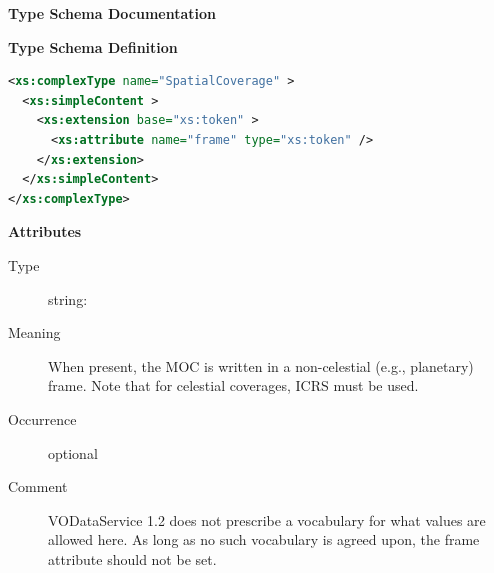 \documentclass[11pt,a4paper]{ivoa}
\begin{document}
\begin{generated}
\begingroup
        \renewcommand*\descriptionlabel[1]{%
        \hbox to 5.5em{\emph{#1}\hfil}}\vspace{2ex}\noindent\textbf{ Type Schema Documentation}


\vspace{1ex}\noindent\textbf{ Type Schema Definition}

\begin{lstlisting}[language=XML,basicstyle=\footnotesize]
<xs:complexType name="SpatialCoverage" >
  <xs:simpleContent >
    <xs:extension base="xs:token" >
      <xs:attribute name="frame" type="xs:token" />
    </xs:extension>
  </xs:simpleContent>
</xs:complexType>
\end{lstlisting}

\vspace{0.5ex}\noindent\textbf{ Attributes}

\begingroup\small\begin{bigdescription}
\item[frame]
\begin{description}
\item[Type] string: 
\item[Meaning] When present, the MOC is written in a non-celestial (e.g.,
                     planetary) frame.  Note that for celestial coverages,
                     ICRS must be used.
\item[Occurrence] optional
\item[Comment] VODataService 1.2 does not prescribe a vocabulary for
                     what values are allowed here.  As
                     long as no such vocabulary is agreed upon, the frame
                     attribute should not be set.
\end{description}


\end{bigdescription}\endgroup

\endgroup
\end{generated}

\end{document}
